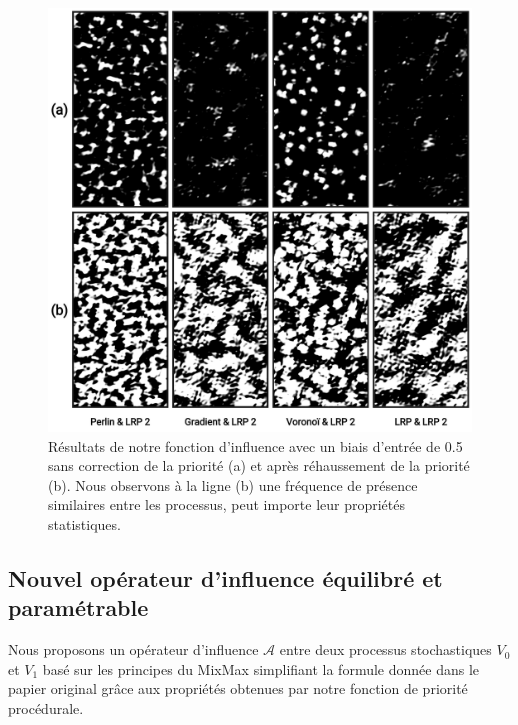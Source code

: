 \documentclass[9pt, twocolumn]{article} %
\begin{document}
\begin{figure}
  \includegraphics[width=\linewidth]{figures/MixMax_PriorityCorrection.png}
  \caption{
    Résultats de notre fonction d'influence avec un biais d'entrée de 0.5 sans correction de la priorité (a) et après réhaussement de la priorité (b). Nous observons à la ligne (b) une fréquence de présence similaires entre les processus, peut importe leur propriétés statistiques.
  }
  \label{fig::MixMax_PriorityCorrection}
\end{figure}

\subsection{Nouvel opérateur d'influence équilibré et paramétrable}

Nous proposons un opérateur d'influence $\mathcal{A}$ entre deux processus
stochastiques $V_0$ et $V_1$ basé sur les principes du MixMax simplifiant la
formule donnée dans le papier original \cite{mixmax} grâce aux propriétés
obtenues par notre fonction de priorité procédurale.
\end{document}
